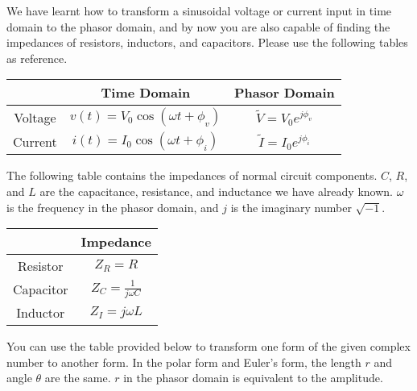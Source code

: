

We have learnt how to transform a sinusoidal voltage or current input in time domain to the phasor domain, and by now you are also capable
of finding the impedances of resistors, inductors, and capacitors. Please use the following tables as reference. 
\begin{center} \begin{tabular}{|c|c|c|}
\hline
        & Time Domain                         & Phasor Domain \\ \hline
Voltage & $v(t) = V_0 \cos(\omega t + \phi_v)$ & $\widetilde{V} = V_0 e^{j\phi_v}$ \\ 
Current & $i(t) = I_0 \cos(\omega t + \phi_i)$ & $\widetilde{I} = I_0 e^{j\phi_i}$ \\
\hline
\end{tabular} \end{center}

The following table contains the impedances of normal circuit components. $C$, $R$, and $L$ are the capacitance, resistance, and inductance we have 
already known. $\omega$ is the frequency in the phasor domain, and $j$ is the imaginary number $\sqrt{-1}$.  
\begin{center} \begin{tabular}{|c|c|}
    \hline
            & Impedance   \\ \hline
    Resistor & $Z_R=R$    \\
    Capacitor & $Z_C=\frac{1}{j{\omega}C}$ \\
    Inductor & $Z_I=j{\omega}L$\\
    \hline
    \end{tabular} \end{center}

You can use the table provided below to transform one form of the given complex number to another form. In the polar form and Euler's form,
the length $r$ and angle $\theta$ are the same. $r$ in the phasor domain is equivalent to the amplitude.

